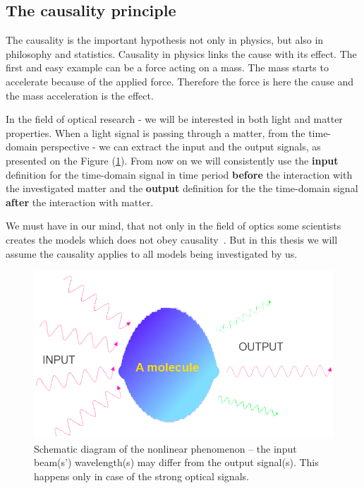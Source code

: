 \documentclass[12pt,twoside,a4paper]{article}
\numberwithin{equation}{subsection}
\numberwithin{figure}{subsection}
\begin{document}
\subsection{The causality principle} \label{chap:mathematical_causality}

The causality is the important hypothesis not only in physics, but also in philosophy and statistics. Causality in physics links the cause
with its effect. The first and easy example can be a force acting on a mass. The mass starts to accelerate because of the applied force.
Therefore the force is here the cause and the mass acceleration is the effect.

In the field of optical research - we will be interested in both light and matter properties. When a light signal is passing through a
matter, from the time-domain perspective - we can extract the input and the output signals, as presented on the Figure
(\ref{fig:mathematical_inoutput}). From now on we will consistently use the \textbf{input} definition for the time-domain signal in time
period \textbf{before} the interaction with the investigated matter and the \textbf{output} definition for the the time-domain signal
\textbf{after} the interaction with matter.

 We must have in our mind, that not only in the field of optics some scientists creates the models which does not obey
 causality~\cite{mukamel_causal}. But in this thesis we will assume the causality applies to all models being investigated by us.

\begin{figure} 
  \includegraphics[width=150mm]{img/opt_phenom3.png}
  \caption{Schematic diagram of the nonlinear phenomenon -- the input beam(s') wavelength(s) may differ from the output signal(s).
  This happens only in case of the strong optical signals.
  \label{fig:mathematical_inoutput}}
\end{figure}
\end{document}
